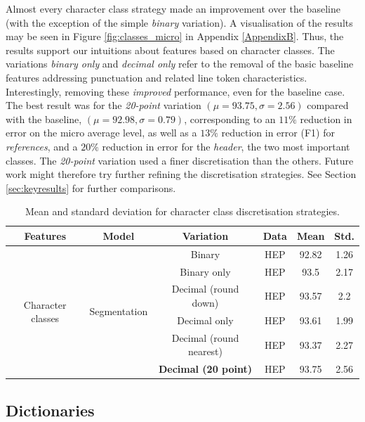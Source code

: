 Almost every character class strategy made an improvement over the baseline (with the exception of the simple \emph{binary} variation). A visualisation of the results may be seen in Figure \ref{fig:classes_micro} in Appendix \ref{AppendixB}. Thus, the results support our intuitions about features based on character classes. The variations \emph{binary only} and \emph{decimal only} refer to the removal of the basic baseline features addressing punctuation and related line token characteristics. Interestingly, removing these \emph{improved} performance, even for the baseline case. The best result was for the \emph{20-point} variation $(\mu = 93.75, \sigma = 2.56)$ compared with the baseline, $(\mu = 92.98, \sigma = 0.79)$, corresponding to an $11\%$ reduction in error on the micro average level, as well as a $13\%$ reduction in error (F1) for \emph{references}, and a $20\%$ reduction in error for the \emph{header}, the two most important classes. The \emph{20-point} variation used a finer discretisation than the others. Future work might therefore try further refining the discretisation strategies. See Section \ref{sec:keyresults} for further comparisons.

\begin{table}[h]
\begin{center}
\begin{tabular}{|c|c|c|c|c|c|}
\hline
Features & Model & Variation & Data & Mean & Std.\\
\hline
\multirow{6}{*}{Character classes} & \multirow{6}{*}{Segmentation} & Binary & HEP & 92.82 & 1.26\\\cline{3-6}
& & Binary only & HEP & 93.5 & 2.17\\\cline{3-6}
& & Decimal (round down) & HEP & 93.57 & 2.2\\\cline{3-6}
& & Decimal only & HEP & 93.61 & 1.99\\\cline{3-6}
& & Decimal (round nearest) & HEP & 93.37 & 2.27\\\cline{3-6}
& & \textbf{Decimal (20 point)} & HEP & 93.75 & 2.56\\\cline{3-6}
\hline
\end{tabular}
\caption[Mean and standard deviation for character class discretisation strategies.]{Mean and standard deviation for character class discretisation strategies.}
\label{table:characterclassresults}
\end{center}
\end{table}

\subsection{Dictionaries}

